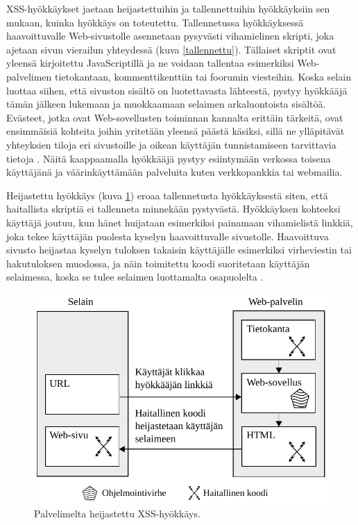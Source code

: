 XSS-hyökkäykset jaetaan heijastettuihin ja tallennettuihin hyökkäyksiin sen mukaan, kuinka hyökkäys on toteutettu. Tallennetussa hyökkäyksessä haavoittuvalle 
Web-sivustolle asennetaan pysyvästi vihamielinen skripti, joka ajetaan
sivun vierailun yhteydessä (kuva \ref{tallennettu}). Tällaiset skriptit ovat yleensä kirjoitettu JavaScriptillä
ja ne voidaan tallentaa esimerkiksi Web-palvelimen tietokantaan, kommenttikenttiin tai foorumin viesteihin. Koska selain luottaa siihen, 
että sivuston sisältö on luotettavasta lähteestä, pystyy hyökkääjä tämän jälkeen lukemaan ja muokkaamaan selaimen arkaluontoista sisältöä. Evästeet, jotka ovat Web-sovellusten 
toiminnan kannalta erittäin tärkeitä, ovat ensimmäisiä kohteita joihin yritetään yleensä päästä käsiksi, sillä ne ylläpitävät yhteyksien tiloja eri 
sivustoille ja oikean käyttäjän tunnistamiseen tarvittavia tietoja \cite{WEB2b}. Näitä kaappaamalla hyökkääjä pystyy esiintymään verkossa toisena käyttäjänä 
ja väärinkäyttämään palveluita kuten verkkopankkia tai webmailia. 

Heijastettu hyökkäys (kuva \ref{heijastettu}) eroaa tallennetusta hyökkäyksestä siten, että haitallista skriptiä ei tallenneta minnekään pystyvästä. Hyökkäyksen kohteeksi käyttäjä joutuu, kun 
hänet huijataan esimerkiksi painamaan vihamielistä linkkiä, joka tekee käyttäjän puolesta kyselyn haavoittuvalle sivustolle. Haavoittuva sivusto heijastaa kyselyn tuloksen 
takaisin käyttäjälle esimerkiksi virheviestin tai hakutuloksen muodossa, ja näin toimitettu koodi suoritetaan käyttäjän selaimessa, koska se tulee selaimen luottamalta
osapuolelta  \cite{WEB2}.

\begin{figure}[htp]
\centering
\includegraphics[width=12cm]{pics/heijastettu.pdf}
\caption{Palvelimelta heijastettu XSS-hyökkäys.}
\label{heijastettu}
\end{figure}

